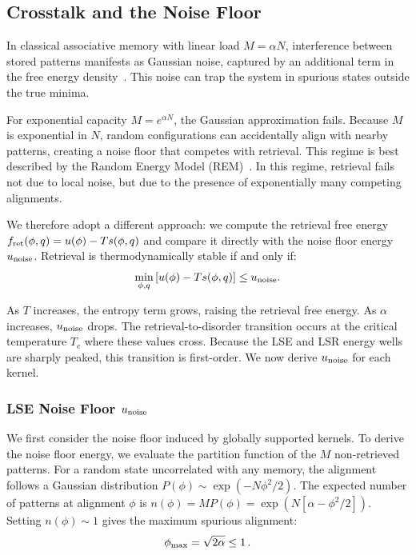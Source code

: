 \documentclass{article}
\theoremstyle{plain}
\theoremstyle{definition}
\theoremstyle{remark}
\begin{document}
\subsection{Crosstalk and the Noise Floor}

In classical associative memory with linear load $M = \alpha N$, interference between stored patterns manifests as Gaussian noise, captured by an additional term in the free energy density~\citep{amit1987statistical}. This noise can trap the system in spurious states outside the true minima.

For exponential capacity $M = e^{\alpha N}$, the Gaussian approximation fails. Because $M$ is exponential in $N$, random configurations can accidentally align with nearby patterns, creating a noise floor that competes with retrieval. This regime is best described by the Random Energy Model (REM)~\citep{derrida1980random}. In this regime, retrieval fails not due to local noise, but due to the presence of exponentially many competing alignments.

We therefore adopt a different approach: we compute the retrieval free energy $f_{\rm ret}(\phi, q) = u(\phi) - T s(\phi, q)$ and compare it directly with the noise floor energy $u_{\rm noise}$. Retrieval is thermodynamically stable if and only if:
\begin{equation}
    \min_{\phi, q} \left[ u(\phi) - T s(\phi, q) \right] \leq u_{\rm noise}.
    \label{eq:stability}
\end{equation}

As $T$ increases, the entropy term grows, raising the retrieval free energy. As $\alpha$ increases, $u_{\rm noise}$ drops. The retrieval-to-disorder transition occurs at the critical temperature $T_c$ where these values cross. Because the LSE and LSR energy wells are sharply peaked, this transition is first-order. We now derive $u_{\rm noise}$ for each kernel.


\subsubsection{LSE Noise Floor $u_{\rm noise}$}
We first consider the noise floor induced by globally supported kernels. To derive the noise floor energy, we evaluate the partition function of the $M$ non-retrieved patterns. For a random state uncorrelated with any memory, the alignment follows a Gaussian distribution $P(\phi) \sim \exp(-N\phi^2/2)$. The expected number of patterns at alignment $\phi$ is $n(\phi) = M P(\phi) = \exp(N[\alpha - \phi^2/2])$. Setting $n(\phi) \sim 1$ gives the maximum spurious alignment:
\begin{equation}
    \phi_{\rm max} = \sqrt{2\alpha} \le 1\,.
    \label{eq:max_spur}
\end{equation}
\end{document}
